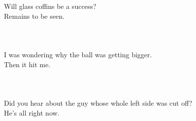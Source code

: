 
\usepackage{blindtext}



Will glass coffins be a success?\\
 Remains to be seen.\\\\

\blindtext
\blindtext \\\\



I was wondering why the ball was getting bigger.\\
 Then it hit me.\\\\


\blindtext
\blindtext\\\\

Did you hear about the guy whose whole left side was cut off?\\
 He's all right now.\\\\

